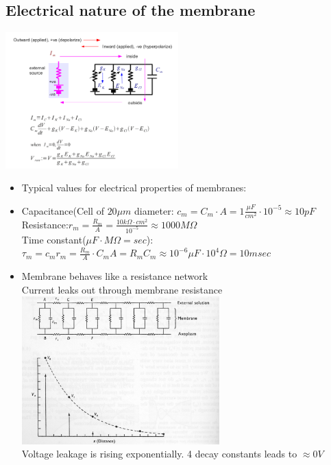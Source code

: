 \documentclass[english,11pt]{article}
\begin{document}
\subsection{Electrical nature of the membrane}
\includegraphics[width=0.5\textwidth]{electrical-membrane.png}
\begin{itemize}
\item Typical values for electrical properties of membranes:
\item Capacitance(Cell of $20\mu m$ diameter: $c_m =C_m \cdot A = 1\frac{\mu F}{cm^2} \cdot 10^{-5} \approx 10 pF$\\
Resistance:$r_m = \frac{R_m}{A} = \frac{10k\Omega\cdot cm^2}{10^{-5}} \approx 1000 M\Omega$\\
Time constant($\mu F \cdot M\Omega = sec$): $\tau_m = c_m r_m = \frac{R_m}{A}\cdot C_m A = R_m C_m \approx 10^{-6} \mu F \cdot 10^4\Omega = 10msec$
\item Membrane behaves like a resistance network\\
Current leaks out through membrane resistance\\
\includegraphics[width=0.6\textwidth]{membrane-leakage.png}\\
Voltage leakage is rising exponentially. 4 decay constants leads to $\approx 0 V$
\end{itemize}
\end{document}
